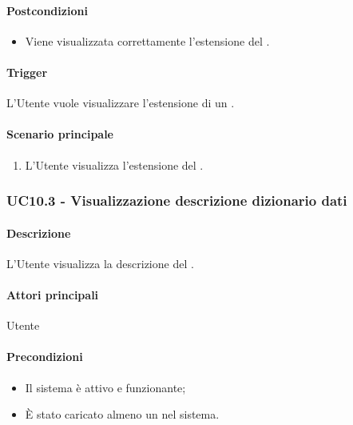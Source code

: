 \paragraph*{Postcondizioni}
\begin{itemize}
  \item Viene visualizzata correttamente l'estensione del .
\end{itemize}

\paragraph*{Trigger}
L'Utente vuole visualizzare l'estensione di un .

\paragraph*{Scenario principale}
\begin{enumerate}
  \item L'Utente visualizza l'estensione del .
\end{enumerate}


\subsubsection{UC10.3 - Visualizzazione descrizione dizionario dati}\label{UC10point3}
\paragraph*{Descrizione}
L'Utente visualizza la descrizione del .

\paragraph*{Attori principali}
Utente

\paragraph*{Precondizioni}
\begin{itemize}
  \item Il sistema è attivo e funzionante;
  \item È stato caricato almeno un  nel sistema. 
\end{itemize}

